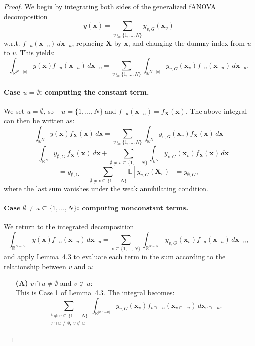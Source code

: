 \begin{proof}
We begin by integrating both sides of the generalized fANOVA decomposition
\[
y(\mathbf{x}) = \sum_{v \subseteq \{1,\dots,N\}} y_{v,G}(\mathbf{x}_v)
\]
w.r.t. $f_{-u}(\mathbf{x}_{-u})\, d\mathbf{x}_{-u}$, replacing $\boldsymbol{X}$ by $\boldsymbol{x}$, and changing the dummy index from $u$ to $v$. This yields:
\[
\int_{\mathbb{R}^{N - |u|}} y(\mathbf{x}) f_{-u}(\mathbf{x}_{-u}) \, d\mathbf{x}_{-u}
= \sum_{v \subseteq \{1,\dots,N\}} \int_{\mathbb{R}^{N - |u|}} y_{v,G}(\mathbf{x}_v) f_{-u}(\mathbf{x}_{-u}) \, d\mathbf{x}_{-u}.
\]

\paragraph{Case \( u = \emptyset \): computing the constant term.}
We set $u = \emptyset$, so $-u = \{1,\dots,N\}$ and $f_{-u}(\boldsymbol{x}_{-u}) = f_{\boldsymbol{X}}(\boldsymbol{x})$. The above integral can then be written as:
\[
\int_{\mathbb{R}^N} y(\mathbf{x}) f_{\mathbf{X}}(\mathbf{x}) \, d\mathbf{x}
= \sum_{v \subseteq \{1,\dots,N\}} \int_{\mathbb{R}^N} y_{v,G}(\mathbf{x}_v) f_{\mathbf{X}}(\mathbf{x}) \, d\mathbf{x}
\]
\[
= \int_{\mathbb{R}^N} y_{\emptyset,G} \, f_{\mathbf{X}}(\mathbf{x}) \, d\mathbf{x}
+ \sum_{\emptyset \ne v \subseteq \{1,\dots,N\}} \int_{\mathbb{R}^N} y_{v,G}(\mathbf{x}_v) f_{\mathbf{X}}(\mathbf{x}) \, d\mathbf{x}
\]
\[
= y_{\emptyset,G} + \sum_{\emptyset \ne v \subseteq \{1,\dots,N\}} \mathbb{E}[y_{v,G}(\mathbf{X}_v)] = y_{\emptyset,G},
\]
where the last sum vanishes under the weak annihilating condition.

\paragraph{Case \( \emptyset \ne u \subseteq \{1,\dots,N\} \): computing nonconstant terms.}
We return to the integrated decomposition
\[
\int_{\mathbb{R}^{N - |u|}} y(\mathbf{x}) f_{-u}(\mathbf{x}_{-u}) \, d\mathbf{x}_{-u}
= \sum_{v \subseteq \{1,\dots,N\}} \int_{\mathbb{R}^{N - |u|}} y_{v,G}(\mathbf{x}_v) f_{-u}(\mathbf{x}_{-u}) \, d\mathbf{x}_{-u},
\]
and apply Lemma~4.3 to evaluate each term in the sum according to the relationship between $v$ and $u$:

\begin{itemize}
  \item[\textbf{(A)}] \( v \cap u \ne \emptyset \) and \( v \not\subset u \): \\
  This is Case 1 of Lemma~4.3. The integral becomes:
  \[
  \sum_{\substack{\emptyset \ne v \subseteq \{1,\dots,N\} \\ v \cap u \ne \emptyset,\ v \not\subset u}} 
  \int_{\mathbb{R}^{|v \cap -u|}} y_{v,G}(\mathbf{x}_v) f_{v \cap -u}(\mathbf{x}_{v \cap -u}) \, d\mathbf{x}_{v \cap -u}.
  \]


\end{itemize}
\end{proof}
